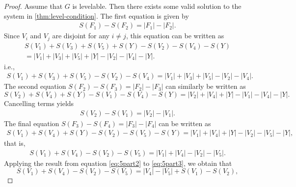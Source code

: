 \begin{proof}
Assume that $G$ is levelable. Then there exists some valid solution to the system in \autoref{thm:level-condition}. The first equation is given by
\begin{equation*}
\begin{aligned}
S(F_1) - S(F_2) = |F_1| - |F_2|.
\end{aligned}
\end{equation*}
Since $V_i$ and $V_j$ are disjoint for any $i \neq j$, this equation can be written as
\begin{equation*}
\begin{aligned}
S(V_1) + S(V_3) + S(V_5) + S(Y) - S(V_2) - S(V_4) - S(Y) \\
= |V_1| + |V_3| + |V_5| + |Y| - |V_2| - |V_4| -|Y|.
\end{aligned}
\end{equation*}
i.e., 
\begin{equation} \label{eq:5part1}
\begin{aligned}
S(V_1) + S(V_3) + S(V_5) - S(V_2) - S(V_4) = |V_1| + |V_3| + |V_5| - |V_2| - |V_4|.
\end{aligned}
\end{equation}
The second equation $S(F_2) - S(F_3) = |F_2| - |F_3|$ can similarly be written as
$$
S(V_2) + S(V_4)  +  S(Y) - S(V_1) - S(V_4) - S(Y) = |V_2| + |V_4| +|Y| - |V_1| - |V_4| - |Y|.
$$
Cancelling terms yields
\begin{equation} \label{eq:5part2}
\begin{aligned}
S(V_2) - S(V_1) = |V_2| - |V_1| .
\end{aligned}
\end{equation}
The final equation $S(F_3) - S(F_4) = |F_3| - |F_4|$ can be written as
\begin{equation*} 
\begin{aligned}
S(V_1) + S(V_4) + S(Y)- S(V_2) - S(V_5) - S(Y)= |V_1| + |V_4| + |Y|- |V_2| - |V_5| - |Y|,
\end{aligned}
\end{equation*}
that is,
\begin{equation} \label{eq:5part3}
\begin{aligned}
S(V_1) + S(V_4) - S(V_2) - S(V_5) = |V_1| + |V_4| -|V_2| - |V_5|.
\end{aligned}
\end{equation}
Applying the result from equation \eqref{eq:5part2} to \eqref{eq:5part3}, we obtain that
$$
S(V_1) + S(V_4) - S(V_2) - S(V_5) =  |V_4| - |V_5|  + S(V_1)  - S(V_2),
$$

\end{proof}
